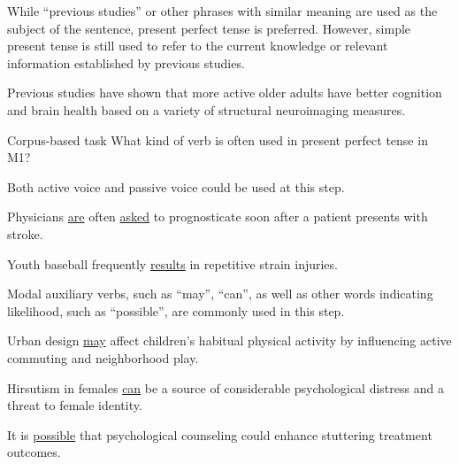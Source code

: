 \documentclass{ctexbook}
\begin{document}
    While ``previous studies'' or other phrases with similar meaning are used as the subject of the sentence, present perfect tense is preferred. However, simple present tense is still used to refer to the current knowledge or relevant information established by previous studies.

    \begin{eg}[label={myautocounter}]{}
      Previous studies have shown that more active older adults have better cognition and brain health based on a variety of structural neuroimaging measures.
    \end{eg}

    \begin{task}[label={myautocounter}]{\heiti Corpus-based task}
      What kind of verb is often used in present perfect tense in M1?
    \end{task}

    Both active voice and passive voice could be used at this step.

    \begin{eg}[label={myautocounter}]{}
      Physicians \uline{are} often \uline{asked} to prognosticate soon after a patient presents with stroke.
    \end{eg}

    \begin{eg}[label={myautocounter}]{}
      Youth baseball frequently \uline{results} in repetitive strain injuries.
    \end{eg}

    Modal auxiliary verbs, such as ``may'', ``can'', as well as other words indicating likelihood, such as ``possible'', are commonly used in this step.

    \begin{eg}[label={myautocounter}]{}
      Urban design \uline{may} affect children's habitual physical activity by influencing active commuting and neighborhood play.
    \end{eg}

    \begin{eg}[label={myautocounter}]{}
      Hirsutism in females \uline{can} be a source of considerable psychological distress and a threat to female identity.
    \end{eg}

    \begin{eg}[label={myautocounter}]{}
      It is \uline{possible} that psychological counseling could enhance stuttering treatment outcomes.
    \end{eg}
\end{document}

